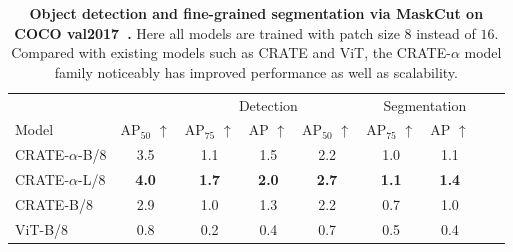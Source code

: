 \documentclass[../../book-main.tex]{subfiles}
\begin{document}
\begin{table}[t]
\caption{\small \textbf{Object detection and fine-grained
segmentation via MaskCut on COCO val2017~\citep{lin2014microsoft}.}
Here all models are trained with patch size \(8\) instead of \(16\).
Compared with existing models such as CRATE and ViT, the
CRATE-\(\alpha\) model family noticeably has improved performance as
well as scalability.}
\centering
\begin{tabular}{@{}lcccccccc@{}}
\toprule
&  & \multicolumn{3}{c}{Detection} &  \multicolumn{3}{c}{Segmentation} \\
Model & AP\(_{50}\) \(\uparrow\) & AP\(_{75}\) \(\uparrow\) & AP \(\uparrow\) &
AP\(_{50}\) \(\uparrow\) & AP\(_{75}\) \(\uparrow\) & AP \(\uparrow\) \\
\midrule
\midrule
CRATE-\(\alpha\)-B/8 & 3.5 & 1.1 & 1.5 & 2.2 & 1.0 & 1.1 \\
CRATE-\(\alpha\)-L/8 & \textbf{4.0} & \textbf{1.7} & \textbf{2.0} &
\textbf{2.7} & \textbf{1.1} & \textbf{1.4} \\
\midrule
\color{gray}CRATE-B/8 & \color{gray}2.9 & \color{gray}1.0 &
\color{gray}1.3 & \color{gray}2.2 & \color{gray}0.7 & \color{gray}1.0 \\
\color{gray}ViT-B/8 & \color{gray}0.8 & \color{gray}0.2 &
\color{gray}0.4 & \color{gray}0.7 & \color{gray}0.5 & \color{gray}0.4 \\
\bottomrule
\end{tabular}
\label{tab:crate_alpha_detection_segmentation}
\end{table}
\end{document}
